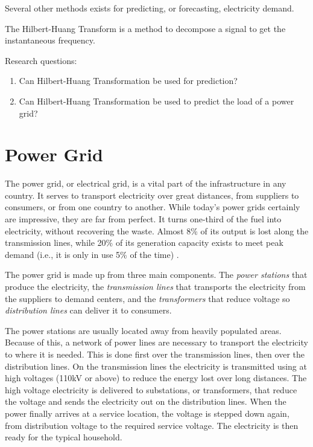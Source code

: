 \documentclass[12pt]{article}
\begin{document}
	Several other methods exists for predicting, or forecasting, electricity demand. 
	
	The Hilbert-Huang Transform is a method to decompose a signal to get the instantaneous frequency. 
	
	
	
	Research questions:
	\begin{enumerate}
		\item Can Hilbert-Huang Transformation be used for prediction?
		\item Can Hilbert-Huang Transformation be used to predict the load of a power grid?
	\end{enumerate}

\section{Power Grid}
	\label{sec:powerGrid}
	The power grid, or electrical grid, is a vital part of the infrastructure in any country. It serves to transport electricity over great distances, from suppliers to consumers, or from one country to another. While today's power grids certainly are impressive, they are far from perfect. It turns one-third of the fuel into electricity, without recovering the waste. Almost 8\% of its output is lost along the transmission lines, while 20\% of its generation capacity exists to meet peak demand (i.e., it is only in use 5\% of the time) \cite{smartgridPath}.
	
	The power grid is made up from three main components. The \textit{power stations} that produce the electricity, the \textit{transmission lines} that transports the electricity from the suppliers to demand centers, and the \textit{transformers} that reduce voltage so \textit{distribution lines} can deliver it to consumers.
	
	The power stations are usually located away from heavily populated areas. Because of this, a network of power lines are necessary to transport the electricity to where it is needed. This is done first over the transmission lines, then over the distribution lines. On the transmission lines the electricity is transmitted using at high voltages (110kV or above) to reduce the energy lost over long distances. The high voltage electricity is delivered to substations, or transformers, that reduce the voltage and sends the electricity out on the distribution lines. When the power finally arrives at a service location, the voltage is stepped down again, from distribution voltage to the required service voltage. The electricity is then ready for the typical household. 
\end{document}
